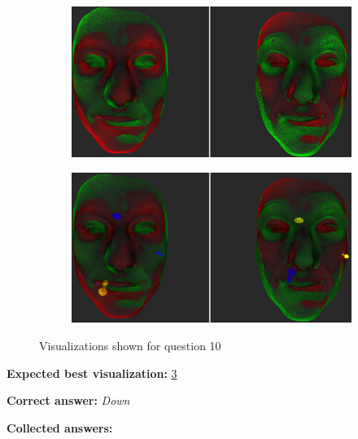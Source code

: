 \begin{figure}[h]
\begin{subfigure}{0.4\textwidth}
\includegraphics[width=\textwidth]{./screenshots/pair20.PNG}
\caption{}
\label{fig:study-9-20}
\end{subfigure}
\quad
\begin{subfigure}{0.4\textwidth}
\includegraphics[width=\textwidth]{./screenshots/pair24.PNG}
\caption{}
\label{fig:study-9-24}
\end{subfigure}
\caption{Visualizations shown for question 10}
\end{figure}
\medskip

{\bf Expected best visualization:} \ref{fig:study-9-24}
\medskip

{\bf Correct answer:} {\it Down}
\medskip

{\bf Collected answers:}


